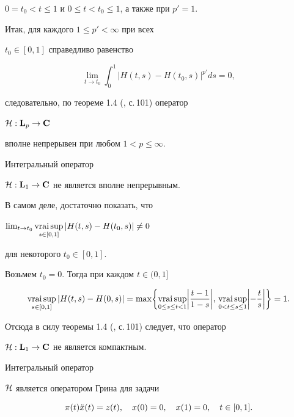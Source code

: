 \begin{pf}
$0=t_0<t\le 1$ и $0\le t<t_0\le 1$, а также при $p'=1$.


Итак, для каждого $1\le p'<\infty$ при всех


$t_0\in[0,1]$ справедливо равенство


$$


\lim_{t\to t_0}\int_0^1|H(t,s)-H(t_0,s)|^{p'}ds=0,


$$


следовательно, по теореме 1.4 (\cite{4}, с.\,101) оператор


${\cal H}:\bold L_p\to\bold C$


вполне непрерывен при любом $1<p\le\infty$.


\end{pf}





\begin{note}


Интегральный оператор


${\cal H}:\bold L_1\to\bold C$ не является вполне непрерывным.


\end{note}





В самом деле, достаточно показать, что 


$\lim_{t\to t_0}\vraisup\limits_{s\in[0,1]}|H(t,s)-H(t_0,s)|\ne 0$


для некоторого $t_0\in[0,1]$.


Возьмем $t_0=0$. Тогда при каждом $t\in(0,1]$


$$


\vraisup\limits_{s\in[0,1]}|H(t,s)-H(0,s)|=


\max\biggl\{\vraisup\limits_{0\le s\le t<1}\biggl|\frac{t-1}{1-s}\biggr|,\,


\vraisup\limits_{0<t\le s\le 1}\biggl|-\frac{t}{s}\biggr|\biggr\}=1.


$$


Отсюда в силу теоремы 1.4 (\cite{4}, с.\,101) следует, что оператор


${\cal H}:\bold L_1\to\bold C$ не является компактным.





\begin{note}


Интегральный оператор


${\cal H}$ является оператором Грина для задачи


$$


\pi (t)\Ddot{x}(t)=z(t),\quad


x(0)=0,\quad x(1)=0, \quad t\in [0,1].


$$


\end{note}





